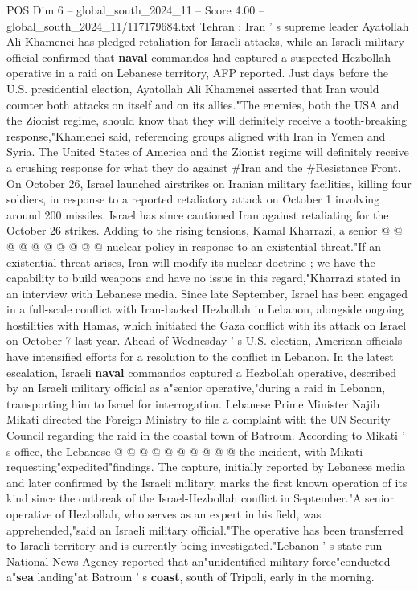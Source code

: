 \begin{textsample}{POS Dim 6 – global\_south\_2024\_11 – Score 4.00 – global\_south\_2024\_11/117179684.txt}  \label{ex:f6_pos_334}
Tehran : Iran ' s supreme leader Ayatollah Ali Khamenei has pledged retaliation for Israeli attacks, while an Israeli military official confirmed that \textbf{naval} commandos had captured a suspected Hezbollah operative in a raid on Lebanese territory, AFP reported.
Just days before the U.S. presidential election, Ayatollah Ali Khamenei asserted that Iran would counter both attacks on itself and on its allies."The enemies, both the USA and the Zionist regime, should know that they will definitely receive a tooth-breaking response,"Khamenei said, referencing groups aligned with Iran in Yemen and Syria.
The United States of America and the Zionist regime will definitely receive a crushing response for what they do against \#Iran and the \#Resistance Front.
On October 26, Israel launched airstrikes on Iranian military facilities, killing four soldiers, in response to a reported retaliatory attack on October 1 involving around 200 missiles.
Israel has since cautioned Iran against retaliating for the October 26 strikes.
Adding to the rising tensions, Kamal Kharrazi, a senior @ @ @ @ @ @ @ @ @ @ nuclear policy in response to an existential threat."If an existential threat arises, Iran will modify its nuclear doctrine ; we have the capability to build weapons and have no issue in this regard,"Kharrazi stated in an interview with Lebanese media.
Since late September, Israel has been engaged in a full-scale conflict with Iran-backed Hezbollah in Lebanon, alongside ongoing hostilities with Hamas, which initiated the Gaza conflict with its attack on Israel on October 7 last year.
Ahead of Wednesday ' s U.S. election, American officials have intensified efforts for a resolution to the conflict in Lebanon.
In the latest escalation, Israeli \textbf{naval} commandos captured a Hezbollah operative, described by an Israeli military official as a"senior operative,"during a raid in Lebanon, transporting him to Israel for interrogation.
Lebanese Prime Minister Najib Mikati directed the Foreign Ministry to file a complaint with the UN Security Council regarding the raid in the coastal town of Batroun.
According to Mikati ' s office, the Lebanese @ @ @ @ @ @ @ @ @ @ the incident, with Mikati requesting"expedited"findings.
The capture, initially reported by Lebanese media and later confirmed by the Israeli military, marks the first known operation of its kind since the outbreak of the Israel-Hezbollah conflict in September."A senior operative of Hezbollah, who serves as an expert in his field, was apprehended,"said an Israeli military official."The operative has been transferred to Israeli territory and is currently being investigated."Lebanon ' s state-run National News Agency reported that an"unidentified military force"conducted a"\textbf{sea} landing"at Batroun ' s \textbf{coast}, south of Tripoli, early in the morning.

\end{textsample}

